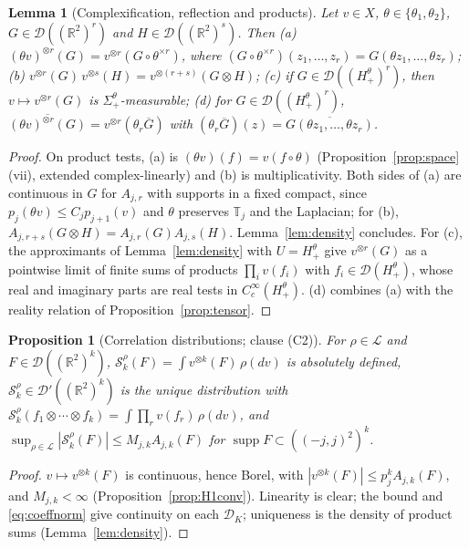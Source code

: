 \documentclass[11pt]{article}
\theoremstyle{plain}
\newtheorem{proposition}[theorem]{Proposition}
\newtheorem{lemma}[theorem]{Lemma}
\theoremstyle{definition}
\theoremstyle{remark}
\newcommand{\R}{\mathbb{R}}
\newcommand{\T}{\mathbb{T}}
\newcommand{\cD}{\mathcal{D}}
\newcommand{\cL}{\mathcal{L}}
\newcommand{\cS}{\mathcal{S}}
\newcommand{\conj}[1]{\overline{#1}}
\DeclareMathOperator{\supp}{supp}
\begin{document}
\begin{lemma}[Complexification, reflection and products]\label{lem:complexify}
Let $v\in X$, $\theta\in\{\theta_1,\theta_2\}$, $G\in\cD((\R^{2})^{r})$ and $H\in\cD((\R^{2})^{s})$. Then
(a) $(\theta v)^{\otimes r}(G)=v^{\otimes r}(G\circ\theta^{\times r})$, where
$(G\circ\theta^{\times r})(z_1,\dots,z_r)=G(\theta z_1,\dots,\theta z_r)$;
(b) $v^{\otimes r}(G)\,v^{\otimes s}(H)=v^{\otimes(r+s)}(G\otimes H)$;
(c) if $G\in\cD((H^{\theta}_{+})^{r})$, then $v\mapsto v^{\otimes r}(G)$ is $\Sigma^{\theta}_{+}$-measurable;
(d) for $G\in\cD((H^{\theta}_{+})^{r})$, $\conj{(\theta v)^{\otimes r}(G)}=v^{\otimes r}(\theta_r\conj G)$ with
$(\theta_r\conj G)(z)=\conj{G(\theta z_1,\dots,\theta z_r)}$.
\end{lemma}

\begin{proof}
On product tests, (a) is $(\theta v)(f)=v(f\circ\theta)$ (Proposition~\ref{prop:space}(vii),
extended complex-linearly) and (b) is multiplicativity. Both sides of (a) are
continuous in $G$ for $A_{j,r}$ with supports in a fixed compact, since
$p_j(\theta v)\le C_jp_{j+1}(v)$ and $\theta$ preserves $\T_j$ and the Laplacian; for (b),
$A_{j,r+s}(G\otimes H)=A_{j,r}(G)A_{j,s}(H)$. Lemma~\ref{lem:density} concludes. For (c), the
approximants of Lemma~\ref{lem:density} with $U=H^{\theta}_{+}$ give $v^{\otimes r}(G)$ as a pointwise
limit of finite sums of products $\prod_iv(f_i)$ with $f_i\in\cD(H^{\theta}_{+})$, whose real and
imaginary parts are real tests in $C_c^{\infty}(H^{\theta}_{+})$. (d) combines (a) with the
reality relation of Proposition~\ref{prop:tensor}.
\end{proof}

\begin{proposition}[Correlation distributions; clause (C2)]\label{prop:correlations}
For $\rho\in\cL$ and $F\in\cD((\R^{2})^{k})$, $\cS^{\rho}_{k}(F)=\int v^{\otimes k}(F)\,\rho(dv)$ is absolutely
defined, $\cS^{\rho}_{k}\in\cD'((\R^{2})^{k})$ is the unique distribution with
$\cS^{\rho}_{k}(f_1\otimes\cdots\otimes f_k)=\int\prod_rv(f_r)\,\rho(dv)$, and
$\sup_{\rho\in\cL}|\cS^{\rho}_{k}(F)|\le M_{j,k}A_{j,k}(F)$ for $\supp F\subset((-j,j)^{2})^{k}$.
\end{proposition}

\begin{proof}
$v\mapsto v^{\otimes k}(F)$ is continuous, hence Borel, with
$|v^{\otimes k}(F)|\le p_j^{k}A_{j,k}(F)$, and $M_{j,k}<\infty$ (Proposition~\ref{prop:H1conv}).
Linearity is clear; the bound and \eqref{eq:coeffnorm} give continuity on each
$\cD_K$; uniqueness is the density of product sums (Lemma~\ref{lem:density}).
\end{proof}
\end{document}
